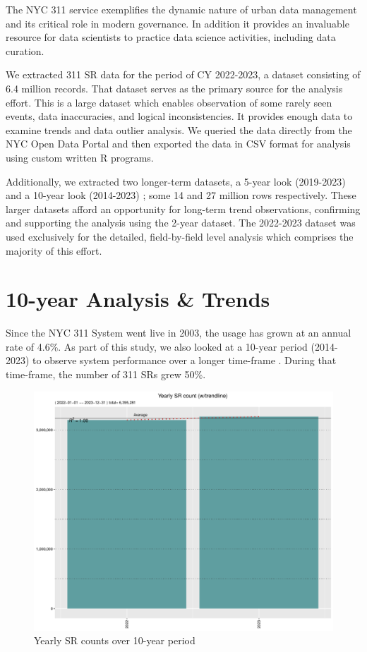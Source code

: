 \documentclass[12pt, titlepage]{article}
\begin{document}
The NYC 311 service exemplifies the dynamic nature of urban data
management and its critical role in modern governance. In addition it provides an
invaluable resource for data scientists to practice data science activities, including data curation.

We extracted 311 SR data for the period of CY 2022-2023, a dataset consisting of
6.4 million records. That dataset serves as the primary source for the analysis effort. This is a large dataset which enables 
observation of some rarely seen events, data inaccuracies, and logical inconsistencies. It provides enough data to examine trends and data outlier analysis. 
We queried the data directly from the NYC Open Data Portal and then exported the data in CSV format for analysis using custom written R programs.

Additionally, we extracted two longer-term datasets, a 5-year look (2019-2023) and a 10-year look (2014-2023) ; some 14 and 27 million rows respectively. 
These larger datasets afford an opportunity for long-term trend observations, confirming and supporting the analysis using the 2-year dataset. The 2022-2023 dataset
was used exclusively for the detailed, field-by-field level analysis which comprises the majority of this effort. 



\section{10-year Analysis \& Trends} \label{sec:trends}

Since the NYC 311 System went live in 2003, the usage has grown at an annual
rate of 4.6\%. As part of this study, we also looked at a 10-year period (2014-2023) to
observe system performance over a longer time-frame . During that time-frame, 
the number of 311 SRs grew 50\%.

\begin{figure}[H]
  \centering
  \includegraphics[width=\textwidth]{Yearly.pdf}
  \caption{Yearly SR counts over 10-year period}
  \label{fig:yearly-counts}
\end{figure}
\end{document}
